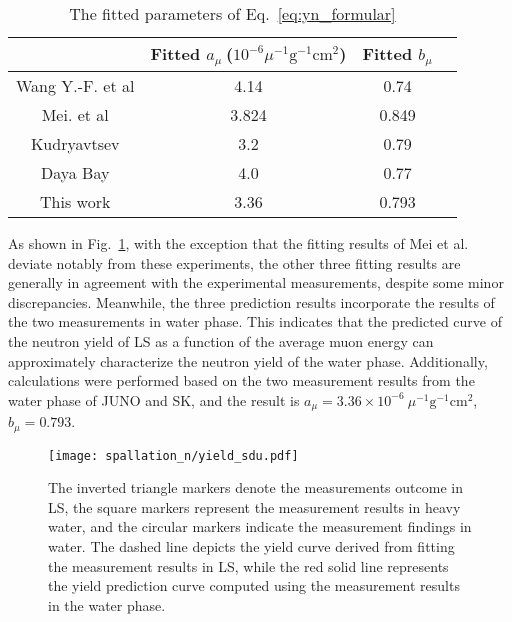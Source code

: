 \begin{table}[htbp]
	\centering
	\caption{The fitted parameters of Eq.~\eqref{eq:yn_formular}}
	\label{tab:fit_E_mu}
	\begin{tabular}{cccc}
		\toprule
		                 & Fitted $a_{\mu}~$($10^{-6}\mu^{-1}\mathrm{g}^{-1}\mathrm{cm}^{2}$) & Fitted $b_{\mu}$ \\
		\midrule
		Wang Y.-F. et al & 4.14                                                               & 0.74             \\
		Mei. et al       & 3.824                                                              & 0.849            \\
		Kudryavtsev      & 3.2                                                                & 0.79             \\
		Daya Bay         & 4.0                                                                & 0.77             \\
		This work        & 3.36                                                               & 0.793            \\
		\bottomrule
	\end{tabular}
\end{table}

As shown in Fig.~\ref{fig:yield_fit_formuler}, with the exception that the fitting results of Mei et al. deviate notably from these experiments, the other three fitting results are generally in agreement with the experimental measurements, despite some minor discrepancies. Meanwhile, the three prediction results incorporate the results of the two measurements in water phase. This indicates that the predicted curve of the neutron yield of LS as a function of the average muon energy can approximately characterize the neutron yield of the water phase. Additionally, calculations were performed based on the two measurement results from the water phase of JUNO and SK, and the result is $a_{\mu}=3.36\times10^{-6}~\mu^{-1}\mathrm{g}^{-1}\mathrm{cm}^{2}$, $b_{\mu}=0.793$.

\begin{figure}[htbp]
	\centering
	\texttt{[image: spallation\_n/yield\_sdu.pdf]}
	\caption{The inverted triangle markers denote the measurements outcome in LS, the square markers represent the measurement results in heavy water, and the circular markers indicate the measurement findings in water. The dashed line depicts the yield curve derived from fitting the measurement results in LS, while the red solid line represents the yield prediction curve computed using the measurement results in the water phase. }
	\label{fig:yield_fit_formuler}
\end{figure}